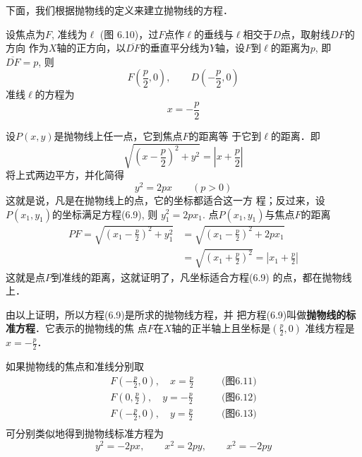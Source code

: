 下面，我们根据抛物线的定义来建立抛物线的方程．

\begin{figure}[htp]
    \centering
{}
    \caption{}
\end{figure}

设焦点为$F$, 准线为$\ell$ (图
6.10)，过$F$点作$\ell$的垂线与$\ell$相交于$D$点，取射线$DF$的方向
作为$X$轴的正方向，以$\overline{DF}$的垂直平分线为$Y$轴，设$F$到$\ell$的距离为$p$, 即$\overline{DF}=p$, 则
\[F\left(\frac{p}{2},0\right),\qquad D\left(-\frac{p}{2},0\right)\]
准线$\ell$的方程为
\[x=-\frac{p}{2}\]

设$P(x,y)$是抛物线上任一点，它到焦点$F$的距离等
于它到$\ell$的距离．即
\[\sqrt{\left(x-\frac{p}{2}\right)^2+y^2}=\left|x+\frac{p}{2}\right|\]
将上式两边平方，并化简得
\begin{equation}
    y^2=2px\qquad (p>0)
\end{equation}
这就是说，凡是在抛物线上的点，它的坐标都适合这一方
程；反过来，设$P(x_1,y_1)$的坐标满足方程(6.9), 则
$y_1^2=2px_1$. 点$P(x_1,y_1)$与焦点$F$的距离
\[\begin{split}
    PF=\sqrt{\left(x_1-\frac{p}{2}\right)^2+y^2_1}&=\sqrt{\left(x_1-\frac{p}{2}\right)^2+2px_1}\\
    &=\sqrt{\left(x_1+\frac{p}{2}\right)^2}=\left|x_1+\frac{p}{2}\right|
\end{split}\]
这就是点$P$到准线的距离，这就证明了，凡坐标适合方程(6.9)
的点，都在抛物线上．

由以上证明，所以方程(6.9)是所求的抛物线方程，并
把方程(6.9)叫做\textbf{抛物线的标准方程}．它表示的抛物线的焦
点$F$在$X$轴的正半轴上且坐标是$\left(\frac{p}{2},0\right)$
准线方程是$x=-\frac{p}{2}$．

如果抛物线的焦点和准线分别取
\[\begin{split}
F\left(-\frac{p}{2},0\right),\quad x=\frac{p}{2}&\qquad \text{(图6.11)}\\
F\left(0,\frac{p}{2}\right),\quad y=-\frac{p}{2}&\qquad \text{(图6.12)}\\
F\left(-\frac{p}{2},0\right),\quad y=\frac{p}{2}&\qquad \text{(图6.13)}\\
\end{split}\]
可分别类似地得到抛物线标准方程为
\[y^2=-2px,\qquad x^2=2py,\qquad x^2=-2py\]

